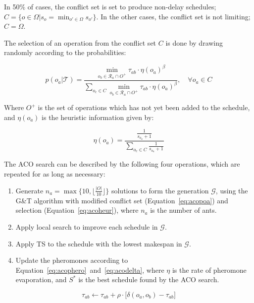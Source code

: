 \documentclass[paper=a4, fontsize=9pt]{scrartcl}
\begin{document}
\begin{multicols}{2}
In 50\% of cases, the conflict set is set to produce non-delay schedules; $C = \{o \in \Omega \vert s_o = \min_{o' \in \Omega} s_{o'}\}$. In the other cases, the conflict set is not limiting; $C = \Omega$.

The selection of an operation from the conflict set $C$ is done by drawing randomly according to the probabilities:

\begin{equation}
p(o_a \vert \mathcal{T}) = \frac
{
    \min_{o_b \in \mathcal{R}_a \cap O^{+}} \tau_{ab} \cdot \eta(o_a)^\beta
}
{
    \sum_{o_c \in C} \min_{o_b \in \mathcal{R}_a \cap O^{+}} \tau_{ab} \cdot \eta(o_a)^\beta
}, \quad \forall o_a \in C
\label{eq:acopoa}
\end{equation}

Where $O^{+}$ is the set of operations which has not yet been added to the schedule, and $\eta(o_a)$ is the heuristic information given by:

\begin{equation}
\eta(o_a) = \frac
{
    \frac{1}{s_{o_a} + 1}
}
{
    \sum_{o_c \in C} \frac{1}{s_{o_a} + 1}
}
\label{eq:acoheur}
\end{equation}

The \ac{ACO} search can be described by the following four operations, which are repeated for as long as necessary:

\begin{enumerate}
    \item Generate $n_a = \max \Big\{ 10, \big\lfloor \frac{\vert O \vert}{10} \big\rfloor \Big\}$ solutions to form the generation $\mathcal{G}$, using the G\&T algorithm with modified conflict set (Equation~\ref{eq:acopoa}) and selection (Equation~\ref{eq:acoheur}), where $n_a$ is the number of ants.
    \item Apply local search to improve each schedule in $\mathcal{G}$.
    \item Apply \ac{TS} to the schedule with the lowest makespan in $\mathcal{G}$.
    \item Update the pheromones according to Equation~\ref{eq:acophero}~and~\ref{eq:acodelta}, where $\eta$ is the rate of pheromone evaporation, and $S^{*}$ is the best schedule found by the \ac{ACO} search.
\end{enumerate}

\begin{equation}
\tau_{ab} \gets \tau_{ab} + \rho \cdot \big[ \delta(o_a, o_b) - \tau_{ab} \big]
\label{eq:acophero}
\end{equation}


\end{multicols}
\end{document}
